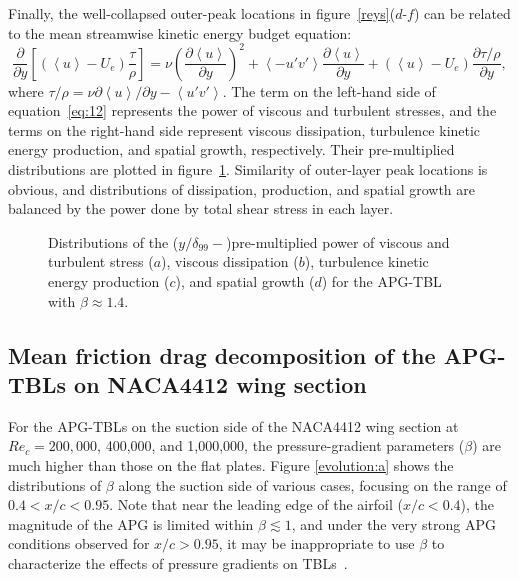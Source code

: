 {\color{black}
Finally, the well-collapsed outer-peak locations in figure~\ref{reys}($d$-$f$) can be related to the mean streamwise kinetic energy budget equation:
\begin{equation}\label{eq:12}
\frac{\partial}{\partial y}\left[\left(\left<u\right>-U_e\right)\frac{\tau}{\rho}\right]=\nu\left(\frac{\partial\left<u\right>}{\partial y}\right)^2+\left<-u'v'\right>\frac{\partial\left<u\right>}{\partial y}+\left(\left<u\right>-U_e\right)\frac{\partial\tau/\rho}{\partial y},
\end{equation}
where $\tau/\rho=\nu\partial\left<u\right>/\partial y-\left<u'v'\right>$. The term on the left-hand side of equation~\eqref{eq:12} represents the power of viscous and turbulent stresses, and the terms on the right-hand side represent viscous dissipation, turbulence kinetic energy production, and spatial growth, respectively. Their pre-multiplied distributions are plotted in figure~\ref{balan}. Similarity of outer-layer peak locations is obvious, and distributions of dissipation, production, and spatial growth are balanced by the power done by total shear stress in each layer.


\begin{figure}
\subfigure{\texttt{[image: 7a]}\label{balan:a}}
\subfigure{\texttt{[image: 7b]}\label{balan:b}}
\subfigure{\texttt{[image: 7c]}\label{balan:c}}
\subfigure{\texttt{[image: 7d]}\label{balan:d}}
\caption{{\color{black}Distributions of the ($y/\delta_{99}-$)pre-multiplied power of viscous and turbulent stress ($a$), viscous dissipation ($b$), turbulence kinetic energy production ($c$), and spatial growth ($d$) for the APG-TBL with $\beta\approx1.4$.}}
\label{balan}
\end{figure}



}


\subsection{Mean friction drag decomposition of the APG-TBLs on NACA4412 wing section}

For the APG-TBLs on the suction side of the NACA4412 wing section at $Re_c=200,000$, 400,000, and 1,000,000, the pressure-gradient parameters ($\beta$) are much higher than those  on the flat plates.  Figure \ref{evolution:a} shows the distributions of $\beta$  along the suction side of various cases, focusing on the range of $0.4<x/c<0.95$. Note that near the leading edge of the airfoil ($x/c<0.4$), the magnitude of the APG is limited within $\beta \lesssim 1$, and under the very strong APG conditions observed for $x/c>0.95$,  it may be inappropriate to use $\beta$ to characterize the effects of pressure gradients on TBLs~\cite{Vinuesa2018,Kitsios2017}.




